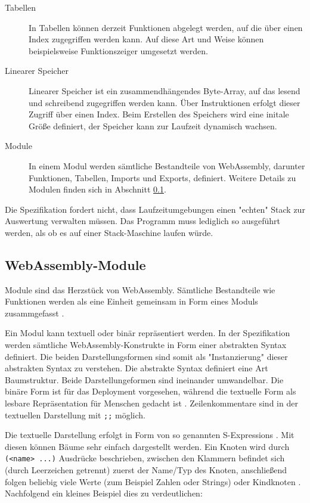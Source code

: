 \begin{description}
    \item[Tabellen] In Tabellen können derzeit Funktionen abgelegt werden, auf die über einen Index zugegriffen werden kann. Auf diese Art und Weise können beispielsweise Funktionszeiger umgesetzt werden. 
    \item[Linearer Speicher] Linearer Speicher ist ein zusammendhängendes Byte-Array, auf das lesend und schreibend zugegriffen werden kann. Über Instruktionen erfolgt dieser Zugriff über einen Index. Beim Erstellen des Speichers wird eine initale Größe definiert, der Speicher kann zur Laufzeit dynamisch wachsen.
    \item[Module] In einem Modul werden sämtliche Bestandteile von WebAssembly, darunter Funktionen, Tabellen, Imports und Exports, definiert. Weitere Details zu Modulen finden sich in Abschnitt \ref{subsec:WebAssembly-Module}.
\end{description}

Die Spezifikation fordert nicht, dass Laufzeitumgebungen einen "echten" Stack zur Auswertung verwalten müssen. Das Programm muss lediglich so ausgeführt werden, als ob es auf einer Stack-Maschine laufen würde.

\subsection{WebAssembly-Module}
\label{subsec:WebAssembly-Module}
Module sind das Herzstück von WebAssembly. Sämtliche Bestandteile wie Funktionen werden als eine Einheit gemeinsam in Form eines Moduls zusammgefasst \cite{WebAssemblySpecification}.

Ein Modul kann textuell oder binär repräsentiert werden. In der Spezifikation werden sämtliche WebAssembly-Konstrukte in Form einer abstrakten Syntax definiert. Die beiden Darstellungsformen sind somit als "Instanzierung" dieser abstrakten Syntax zu verstehen. Die abstrakte Syntax definiert eine Art Baumstruktur. Beide Darstellungeformen sind ineinander umwandelbar. Die binäre Form ist für das Deployment vorgesehen, während die textuelle Form als lesbare Repräsentation für Menschen gedacht ist \cite{WebAssemblySpecification} \cite{MDNWebAssembly}. Zeilenkommentare sind in der textuellen Darstellung mit \lstinline{;;} möglich.

Die textuelle Darstellung erfolgt in Form von so genannten S-Expressions \cite{WebAssemblySpecification}. Mit diesen können Bäume sehr einfach dargestellt werden. Ein Knoten wird durch \lstinline{(<name> ...)} Ausdrücke beschrieben, zwischen den Klammern befindet sich (durch Leerzeichen getrennt) zuerst der Name/Typ des Knoten, anschließend folgen beliebig viele Werte (zum Beispiel Zahlen oder Strings) oder Kindknoten \cite{MDNWebAssembly}. Nachfolgend ein kleines Beispiel dies zu verdeutlichen:

